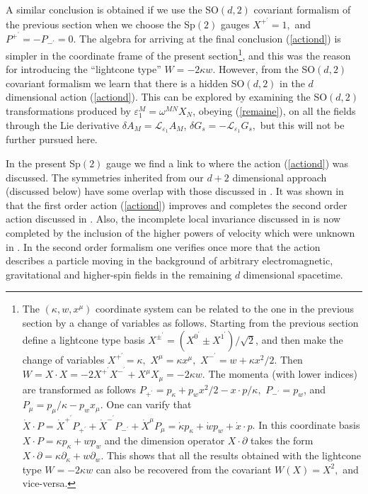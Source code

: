 \documentclass[a4paper,12pt]{article}
\begin{document}
A similar conclusion is obtained if we use the SO$\left( d,2\right) $
covariant formalism of the previous section when we choose the Sp$\left(
2\right) $ gauges $X^{+^{\prime }}=1,$ and $P^{+^{\prime }}=-P_{-^{\prime
}}=0$. The algebra for arriving at the final conclusion (\ref{actiond}) is
simpler in the coordinate frame of the present section\footnote{%
The $\left( \kappa ,w,x^{\mu }\right) $ coordinate system can be related to
the one in the previous section by a change of variables as follows.
Starting from the previous section define a lightcone type basis $X^{\pm
^{\prime }}=\left( X^{0^{\prime }}\pm X^{1^{\prime }}\right) /\sqrt{2}$, and
then make the change of variables $X^{+^{\prime }}=\kappa ,$ $X^{\mu
}=\kappa x^{\mu },$ $X^{-^{\prime }}=w+\kappa x^{2}/2$. Then $W=X\cdot
X=-2X^{+^{\prime }}X^{-^{\prime }}+X^{\mu }X_{\mu }=-2\kappa w$. The momenta
(with lower indices) are transformed as follows $P_{+^{\prime }}=p_{\kappa
}+p_{w}x^{2}/2-x\cdot p/\kappa ,$ $P_{-^{\prime }}=p_{w}$, and $P_{\mu
}=p_{\mu }/\kappa -p_{w}x_{\mu }.$ One can varify that $\dot{X}\cdot P=\dot{X%
}^{+^{\prime }}P_{+^{\prime }}+\dot{X}^{-^{\prime }}P_{-^{\prime }}+\dot{X}%
^{\mu }P_{\mu }=\dot{\kappa}p_{\kappa }+\dot{w}p_{w}+\dot{x}\cdot p$. In
this coordinate basis $X\cdot P=\kappa p_{\kappa }+wp_{w}$ and the dimension
operator $X\cdot \partial $ takes the form $X\cdot \partial =\kappa \partial
_{\kappa }+w\partial _{w}.$ This shows that all the results obtained with
the lightcone type $W=-2\kappa w$ can also be recovered from the covariant $%
W\left( X\right) =X^{2},$ and vice-versa.}, and this was the reason for
introducing the ``lightcone type'' $W=-2\kappa w$. However, from the SO$%
\left( d,2\right) $ covariant formalism we learn that there is a hidden SO$%
\left( d,2\right) $ in the $d$ dimensional action (\ref{actiond}). This can
be explored by examining the SO$\left( d,2\right) $ transformations produced
by $\varepsilon _{1}^{M}=\omega ^{MN}X_{N}$, obeying (\ref{remaine}), on all
the fields through the Lie derivative $\delta A_{M}=\mathcal{L}_{\varepsilon
_{1}}A_{M}$, $\delta G_{s}=-\mathcal{L}_{\varepsilon _{1}}G_{s},$ but this
will not be further pursued here.

In the present Sp$\left( 2\right) $ gauge we find a link to \cite{segal}
where the action (\ref{actiond}) was discussed. The symmetries inherited
from our $d+2$ dimensional approach (discussed below) have some overlap with
those discussed in \cite{segal}. It was shown in \cite{segal} that the first
order action (\ref{actiond}) improves and completes the second order action
discussed in \cite{dwitf}. Also, the incomplete local invariance discussed
in \cite{dwitf} is now completed by the inclusion of the higher powers of
velocity which were unknown in \cite{dwitf}. In the second order formalism
one verifies once more that the action describes a particle moving in the
background of arbitrary electromagnetic, gravitational and higher-spin
fields in the remaining $d$ dimensional spacetime.
\end{document}
